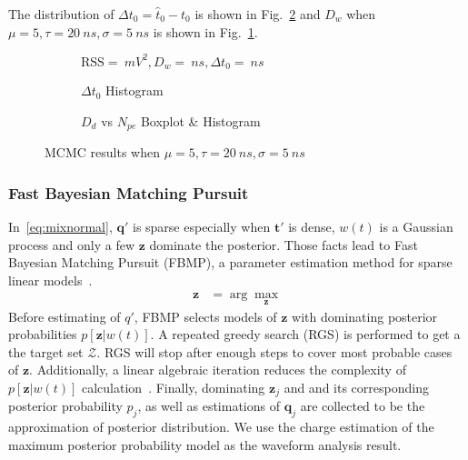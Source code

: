 The distribution of $\Delta{t_0} = \hat{t}_0 - t_0$ is shown in Fig.~\ref{fig:mcmc-t0hist} and $D_w$ when $\mu=5, \tau=\SI{20}{ns}, \sigma=\SI{5}{ns}$ is shown in Fig.~\ref{fig:mcmc}.
\begin{figure}[H]
  \begin{subfigure}{\textwidth}
    \centering
    \resizebox{0.5\textwidth}{!}{}
    \caption{\label{fig:mcmc}$\mathrm{RSS}=\SI{}{mV^2},D_w=\SI{}{ns},\Delta{t_0}=\SI{}{ns}$}
  \end{subfigure}
  \begin{subfigure}{.5\textwidth}
    \centering
    \resizebox{\textwidth}{!}{}
    \caption{\label{fig:mcmc-t0hist} $\Delta t_{0}$ Histogram}
  \end{subfigure}
  \begin{subfigure}{.5\textwidth}
    \centering
    \resizebox{\textwidth}{!}{}
    \caption{\label{fig:mcmc-npe} $D_d$ vs $N_{pe}$ Boxplot \& Histogram}
  \end{subfigure}
  \caption{MCMC results when $\mu=5, \tau=\SI{20}{ns}, \sigma=\SI{5}{ns}$}
\end{figure}

\subsubsection{Fast Bayesian Matching Pursuit}
In~\eqref{eq:mixnormal}, $\bm{q'}$ is sparse especially when $\bm{t'}$ is dense, $w(t)$ is a Gaussian process and only a few $\bm{z}$ dominate the posterior.  Those facts lead to Fast Bayesian Matching Pursuit (FBMP), a parameter estimation method for sparse linear models~\cite{schniter_fast_nodate}.
\begin{align}
    \bm{z} &= \arg \underset{\bm{z}}{\max} \label{eq:map}
\end{align}
Before estimating of $q'$, FBMP selects models of $\bm{z}$ with dominating posterior probabilities $p\left[\bm{z}|w(t)\right]$.  A repeated greedy search (RGS) is performed to get a the target set $\mathcal{Z}$.  RGS will stop after enough steps to cover most probable cases of $\bm{z}$.  Additionally, a linear algebraic iteration reduces the complexity of $p\left[\bm{z}|w(t)\right]$ calculation~\cite{schniter_fast_nodate}.  Finally, dominating $\bm{z}_j$ and and its corresponding posterior probability $p_j$, as well as estimations of $\bm{q}_j$ are collected to be the approximation of posterior distribution.  We use the charge estimation of the maximum posterior probability model as the waveform analysis result. 

